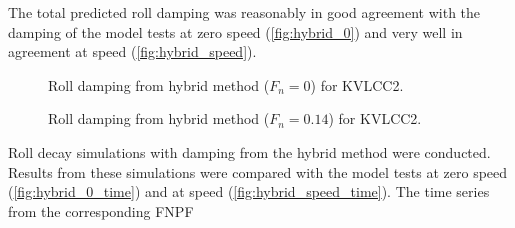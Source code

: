 The total predicted roll damping was reasonably in good agreement with the damping of the model tests at zero speed (\autoref{fig:hybrid_0}) and very well in agreement at speed (\autoref{fig:hybrid_speed}).
\begin{figure}[h]
\caption{Roll damping from hybrid method ($F_n = 0$) for KVLCC2.}
\label{fig:hybrid_0}
\end{figure}
\begin{figure}[h]
\caption{Roll damping from hybrid method ($F_n = 0.14$) for KVLCC2.}
\label{fig:hybrid_speed}
\end{figure}
Roll decay simulations with damping from the hybrid method were conducted. Results from these simulations were compared with the model tests at zero speed (\autoref{fig:hybrid_0_time}) and at speed (\autoref{fig:hybrid_speed_time}). The time series from the corresponding FNPF
